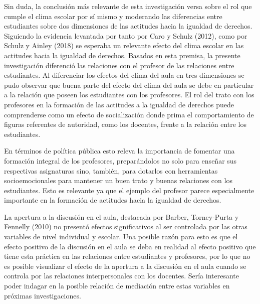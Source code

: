 \documentclass[12pt,twoside]{templates/facsothesis}
\begin{document}
Sin duda, la conclusión más relevante de esta investigación versa sobre el rol que cumple el clima escolar por sí mismo y moderando las diferencias entre estudiantes sobre dos dimensiones de las actitudes hacia la igualdad de derechos. Siguiendo la evidencia levantada por tanto por Caro y Schulz (2012), como por Schulz y Ainley (2018) se esperaba un relevante efecto del clima escolar en las actitudes hacia la igualdad de derechos. Basados en esta premisa, la presente investigación diferenció las relaciones con el profesor de las relaciones entre estudiantes. Al diferenciar los efectos del clima del aula en tres dimensiones se pudo observar que buena parte del efecto del clima del aula se debe en particular a la relación que poseen los estudiantes con los profesores. El rol del trato con los profesores en la formación de las actitudes a la igualdad de derechos puede comprenderse como un efecto de socialización donde prima el comportamiento de figuras referentes de autoridad, como los docentes, frente a la relación entre los estudiantes.

En términos de política pública esto releva la importancia de fomentar una formación integral de los profesores, preparándolos no solo para enseñar sus respectivas asignaturas sino, también, para dotarlos con herramientas socioemocionales para mantener un buen trato y buenas relaciones con los estudiantes. Esto es relevante ya que el ejemplo del profesor parece especialmente importante en la formación de actitudes hacia la igualdad de derechos.

La apertura a la discusión en el aula, destacada por Barber, Torney-Purta y Fennelly (2010) no presentó efectos significativos al ser controlada por las otras variables de nivel individual y escolar. Una posible razón para esto es que el efecto positivo de la discusión en el aula se deba en realidad al efecto positivo que tiene esta práctica en las relaciones entre estudiantes y profesores, por lo que no es posible visualizar el efecto de la apertura a la discusión en el aula cuando se controla por las relaciones interpersonales con los docentes. Sería interesante poder indagar en la posible relación de mediación entre estas variables en próximas investigaciones.
\end{document}
